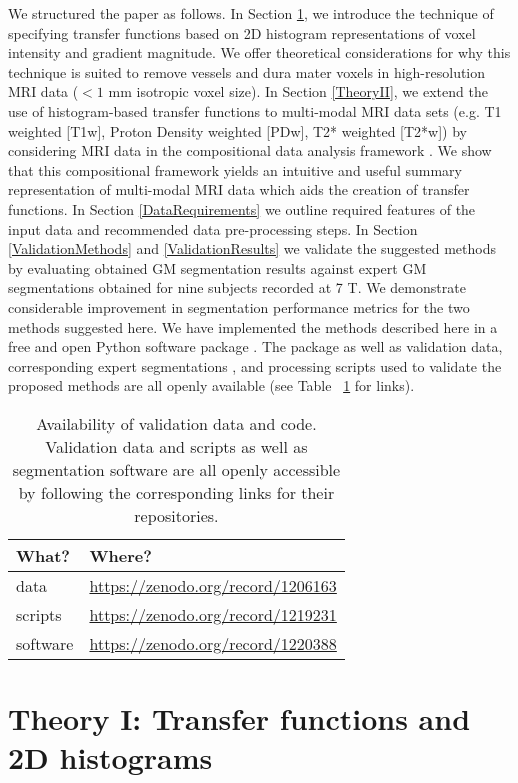 We structured the paper as follows. In Section \ref{TheoryI}, we introduce the technique of specifying transfer functions based on 2D histogram representations of voxel intensity and gradient magnitude. We offer theoretical considerations for why this technique is suited to remove vessels and dura mater voxels in high-resolution MRI data ($< 1$ mm isotropic voxel size). In Section \ref{TheoryII}, we extend the use of histogram-based transfer functions to multi-modal MRI data sets (e.g. T1 weighted [T1w], Proton Density weighted [PDw], T2* weighted [T2*w]) by considering MRI data in the compositional data analysis framework \cite{Pawlowsky-Glahn2015}. We show that this compositional framework yields an intuitive and useful summary representation of multi-modal MRI data which aids the creation of transfer functions. In Section \ref{DataRequirements} we outline required features of the input data and recommended data pre-processing steps. In Section \ref{ValidationMethods} and \ref{ValidationResults} we validate the suggested methods by evaluating obtained GM segmentation results against expert GM segmentations obtained for nine subjects recorded at 7 T. We demonstrate considerable improvement in segmentation performance metrics for the two methods suggested here. We have implemented the methods described here in a free and open Python software package \cite{segmentator}. The package as well as validation data, corresponding expert segmentations \cite{shared_dataset}, and processing scripts \cite{segmentator_processing_scripts} used to validate the proposed methods are all openly available (see Table ~\ref{tab:availability} for links).

\begin{table}[!ht]
\centering
\begin{tabular}{l l}
What? & Where? \\\hline
data & \url{https://zenodo.org/record/1206163}\\
scripts & \url{https://zenodo.org/record/1219231}\\
software & \url{https://zenodo.org/record/1220388}
\end{tabular}
\caption{\label{tab:availability}Availability of validation data and code. Validation data and scripts as well as segmentation software are all openly accessible by following the corresponding links for their repositories.}
\end{table}

\section{Theory I: Transfer functions and 2D histograms} \label{TheoryI}

